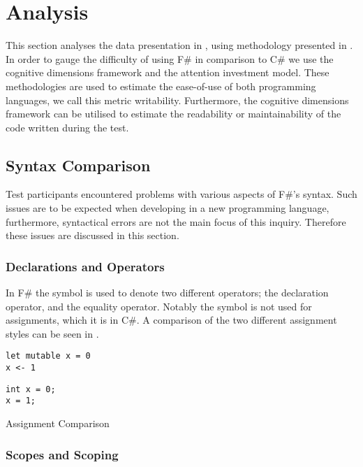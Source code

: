 \section{Analysis}
This section analyses the data presentation in , using methodology presented in . In order to gauge the difficulty of using F\# in comparison to C\# we use the cognitive dimensions framework and the attention investment model. These methodologies are used to estimate the ease-of-use of both programming languages, we call this metric writability. Furthermore, the cognitive dimensions framework can be utilised to estimate the readability or maintainability of the code written during the test.

\subsection{Syntax Comparison}
Test participants encountered problems with various aspects of F\#'s syntax. Such issues are to be expected when developing in a new programming language, furthermore, syntactical errors are not the main focus of this inquiry. Therefore these issues are discussed in this section.

\subsubsection{Declarations and Operators}
In F\# the \ttt{=} symbol is used to denote two different operators; the declaration operator, and the equality operator. Notably the symbol is not used for assignments, which it is in C\#. A comparison of the two different assignment styles can be seen in .

\begin{listing}[H]
\begin{minipage}{.45\textwidth}
\begin{verbatim}
let mutable x = 0
x <- 1
\end{verbatim}
\end{minipage}
\hfill
\begin{minipage}{.45\textwidth}
\begin{verbatim}
int x = 0;
x = 1;
\end{verbatim}
\end{minipage}
\caption{Assignment Comparison}
\label{lst:ass-comp}
\end{listing}

\subsubsection{Scopes and Scoping}

